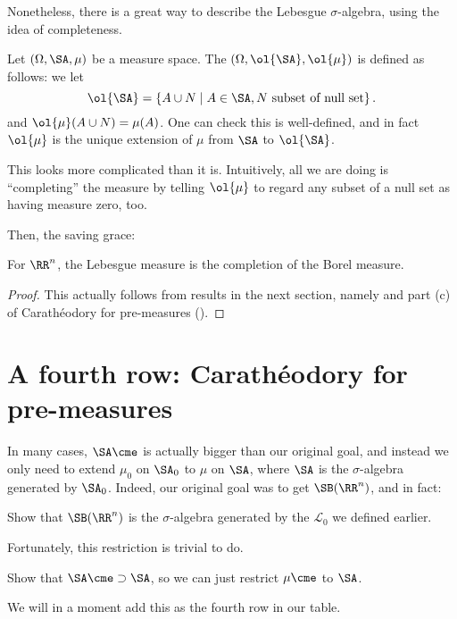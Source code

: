 Nonetheless, there is a great way to describe the Lebesgue $\sigma$-algebra,
using the idea of completeness.
\begin{definition}
	Let $(\Omega, \SA, \mu)$ be a measure space.
	The  $(\Omega, \ol{\SA}, \ol{\mu})$
	is defined as follows:
	we let
	\[ \ol{\SA} = \left\{ A \cup N \mid A \in \SA,
		N \text{ subset of null set} \right\}. \]
	and $\ol{\mu}(A \cup N) = \mu(A)$.
	One can check this is well-defined,
	and in fact $\ol{\mu}$ is the unique extension
	of $\mu$ from $\SA$ to $\ol{\SA}$.

	This looks more complicated than it is.
	Intuitively, all we are doing is ``completing'' the measure
	by telling $\ol{\mu}$ to regard any subset of a null set
	as having measure zero, too.
\end{definition}

Then, the saving grace:
\begin{theorem}
	For $\RR^n$, the Lebesgue measure is the completion of the Borel measure.
\end{theorem}
\begin{proof}
	This actually follows from results in the next section,
	namely 
	and part (c) of Carath\'{e}odory for pre-measures ().
\end{proof}

\section{A fourth row: Carath\'{e}odory for pre-measures}
In many cases, $\SA\cme$ is actually bigger than our original goal,
and instead we only need to extend $\mu_0$ on $\SA_0$
to $\mu$ on $\SA$, where $\SA$ is the $\sigma$-algebra generated by $\SA_0$.
Indeed, our original goal was to get $\SB(\RR^n)$, and in fact:
\begin{exercise}
	Show that $\SB(\RR^n)$ is the $\sigma$-algebra generated
	by the $\mathcal{L}_0$ we defined earlier.
	\label{exer:cubes_vs_open}
\end{exercise}

Fortunately, this restriction is trivial to do.
\begin{ques}
	Show that $\SA\cme \supset \SA$,
	so we can just restrict $\mu\cme$ to $\SA$.
\end{ques}
We will in a moment add this as the fourth row in our table.

